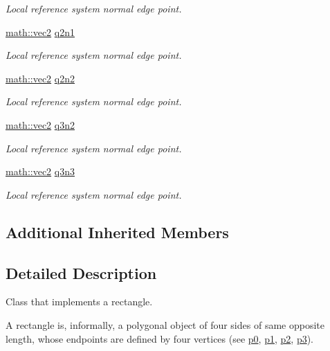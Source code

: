 \begin{DoxyCompactItemize}
\begin{DoxyCompactList}\small\item\em Local reference system normal edge point. \end{DoxyCompactList}\item 
\hyperlink{structphysim_1_1math_1_1vec2}{math\+::vec2} \hyperlink{classphysim_1_1geometry_1_1rectangle_ac066b630fd0c4203119e585f31a823c8}{q2n1}
\begin{DoxyCompactList}\small\item\em Local reference system normal edge point. \end{DoxyCompactList}\item 
\hyperlink{structphysim_1_1math_1_1vec2}{math\+::vec2} \hyperlink{classphysim_1_1geometry_1_1rectangle_ad281a73ad46b23d14774efd077e94533}{q2n2}
\begin{DoxyCompactList}\small\item\em Local reference system normal edge point. \end{DoxyCompactList}\item 
\hyperlink{structphysim_1_1math_1_1vec2}{math\+::vec2} \hyperlink{classphysim_1_1geometry_1_1rectangle_a5e47a8462e16d245662825e040c05966}{q3n2}
\begin{DoxyCompactList}\small\item\em Local reference system normal edge point. \end{DoxyCompactList}\item 
\hyperlink{structphysim_1_1math_1_1vec2}{math\+::vec2} \hyperlink{classphysim_1_1geometry_1_1rectangle_a39daccc2018fad1e58a19c5d478a6b94}{q3n3}
\begin{DoxyCompactList}\small\item\em Local reference system normal edge point. \end{DoxyCompactList}\end{DoxyCompactItemize}
\subsection*{Additional Inherited Members}


\subsection{Detailed Description}
Class that implements a rectangle. 

A rectangle is, informally, a polygonal object of four sides of same opposite length, whose endpoints are defined by four vertices (see \hyperlink{classphysim_1_1geometry_1_1rectangle_a24b32a8de1eb4ffc81700f3e96d89e22}{p0}, \hyperlink{classphysim_1_1geometry_1_1rectangle_a1c5fe9b84a74fce16f20e54a7b77d0cd}{p1}, \hyperlink{classphysim_1_1geometry_1_1rectangle_af871a348483841bcd9b7dee07abd7f83}{p2}, \hyperlink{classphysim_1_1geometry_1_1rectangle_afb92c3176152c9874ed7af55e99f89f4}{p3}).

